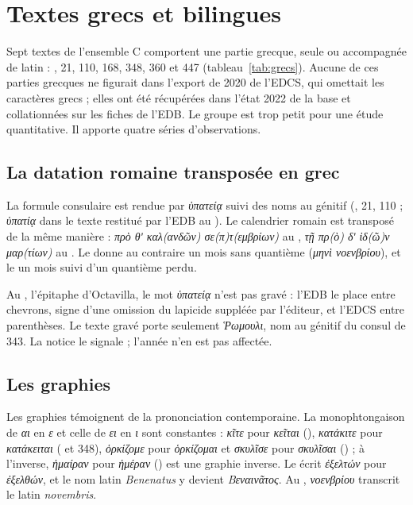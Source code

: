 \chapter{Textes grecs et bilingues}\label{ch:grec}

Sept textes de l’ensemble C comportent une partie grecque, seule ou accompagnée de latin : , 21, 110, 168, 348, 360 et 447 (tableau~\ref{tab:grecs}). Aucune de ces parties grecques ne figurait dans l’export de 2020 de l’EDCS, qui omettait les caractères grecs ; elles ont été récupérées dans l’état 2022 de la base et collationnées sur les fiches de l’EDB. Le groupe est trop petit pour une étude quantitative. Il apporte quatre séries d’observations.



\section{La datation romaine transposée en grec}

La formule consulaire est rendue par \emph{ὑπατείᾳ} suivi des noms au génitif (, 21, 110 ; \emph{ὑπατίᾳ} dans le texte restitué par l’EDB au ). Le calendrier romain est transposé de la même manière : \emph{πρὸ θʹ καλ(ανδῶν) σε(π)τ(εμβρίων)} au , \emph{τῇ πρ(ὸ) δʹ ἰδ(ῶ)ν μαρ(τίων)} au . Le  donne au contraire un mois sans quantième (\emph{μηνὶ νοενβρίου}), et le  un mois suivi d’un quantième perdu.

Au , l’épitaphe d’Octavilla, le mot \emph{ὑπατείᾳ} n’est pas gravé : l’EDB le place entre chevrons, signe d’une omission du lapicide suppléée par l’éditeur, et l’EDCS entre parenthèses. Le texte gravé porte seulement \emph{Ῥωμουλι}, nom au génitif du consul de 343. La notice le signale ; l’année n’en est pas affectée.

\section{Les graphies}

Les graphies témoignent de la prononciation contemporaine. La monophtongaison de \emph{αι} en \emph{ε} et celle de \emph{ει} en \emph{ι} sont constantes : \emph{κῖτε} pour \emph{κεῖται} (), \emph{κατάκιτε} pour \emph{κατάκειται} ( et 348), \emph{ὁρκίζομε} pour \emph{ὁρκίζομαι} et \emph{σκυλῖσε} pour \emph{σκυλῖσαι} () ; à l’inverse, \emph{ἡμαίραν} pour \emph{ἡμέραν} () est une graphie inverse. Le  écrit \emph{ἐξελτών} pour \emph{ἐξελθών}, et le nom latin \emph{Benenatus} y devient \emph{Βεναινᾶτος}. Au , \emph{νοενβρίου} transcrit le latin \emph{novembris}.

